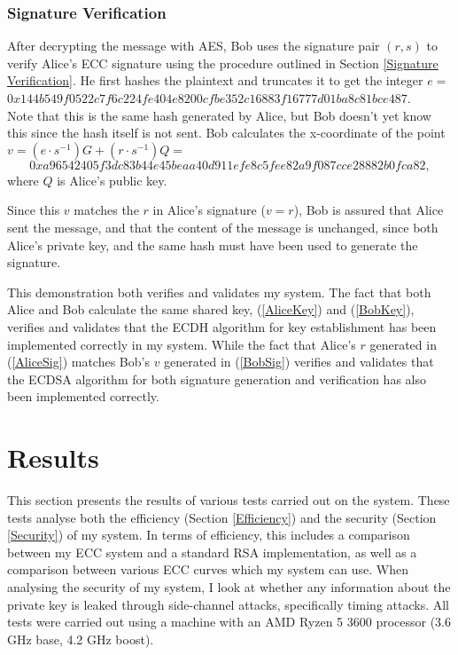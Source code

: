 \documentclass[12pt,a4paper]{article}
\begin{document}
\subsubsection{Signature Verification} \noindent \label{Example4}
After decrypting the message with AES, Bob uses the signature pair $(r,s)$ to verify Alice's ECC signature 
using the procedure outlined in Section \ref{Signature Verification}. 
He first hashes the plaintext and truncates it to get the integer $e =$ \\
{\footnotesize$0x144b549f0522c7f6c224fe404e8200cfbe352c16883f16777d01ba8c81bce487$}. \\
Note that this is the same hash generated by Alice, but Bob doesn't yet know this since the hash itself is not sent. 
Bob calculates the x-coordinate of the point $v = (e \cdot s^{-1})G + (r \cdot s^{-1})Q =$ \\
\begin{equation} \label{BobSig}
    0xa96542405f3dc83b44e45beaa40d911efe8c5fee82a9f087cce28882b0fca82,
\end{equation}
where $Q$ is Alice's public key. 

Since this $v$ matches the $r$ in Alice's signature ($v=r$), 
Bob is assured that Alice sent the message, and that the content of the message is unchanged, 
since both Alice's private key, and the same hash must have been used to generate the signature. 

\vspace{5mm}

This demonstration both verifies and validates my system. 
The fact that both Alice and Bob calculate the same shared key, (\ref{AliceKey}) and (\ref{BobKey}), 
verifies and validates that the ECDH algorithm for key establishment has been implemented correctly in my system. 
While the fact that Alice's $r$ generated in (\ref{AliceSig}) matches Bob's $v$ generated in (\ref{BobSig}) 
verifies and validates that the ECDSA algorithm for both signature generation and verification has also been implemented correctly. 


\section{Results} \noindent \label{Results}
This section presents the results of various tests carried out on the system. 
These tests analyse both the efficiency (Section \ref{Efficiency}) and the security (Section \ref{Security}) of my system. 
In terms of efficiency, this includes a comparison between my ECC system and a standard RSA implementation, 
as well as a comparison between various ECC curves which my system can use. 
When analysing the security of my system, I look at whether any information about the private key is leaked through side-channel attacks, 
specifically timing attacks. 
All tests were carried out using a machine with an AMD Ryzen 5 3600 processor (3.6 GHz base, 4.2 GHz boost). 
\end{document}
